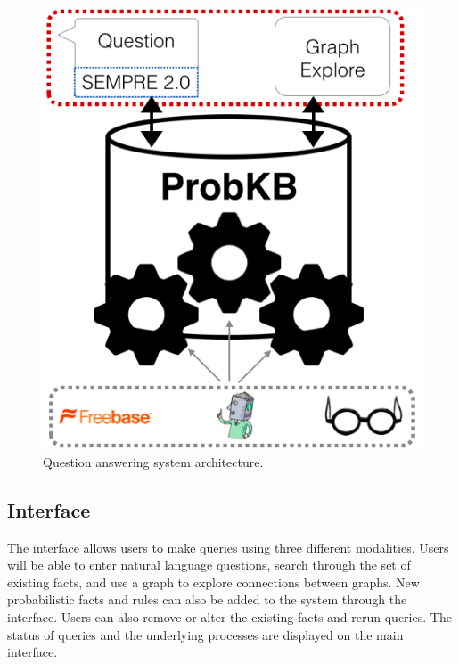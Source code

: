 

\begin{figure}
\centering
\includegraphics[width=0.8\columnwidth]{images/probqa-architecture.png}
\caption{Question answering system architecture.}
\label{fig:qaarchitecture}
\end{figure}


\subsection{Interface}
\label{sec:probqa-interface}

The interface allows users to make queries using three different modalities.
Users will be able to enter natural language questions, search through the set of existing facts, and use a graph to explore connections between graphs.
New probabilistic facts and rules can also be added to the system through the interface.
Users can also remove or alter the existing facts and rerun queries.
The status of queries and the underlying processes are displayed on the main interface.

